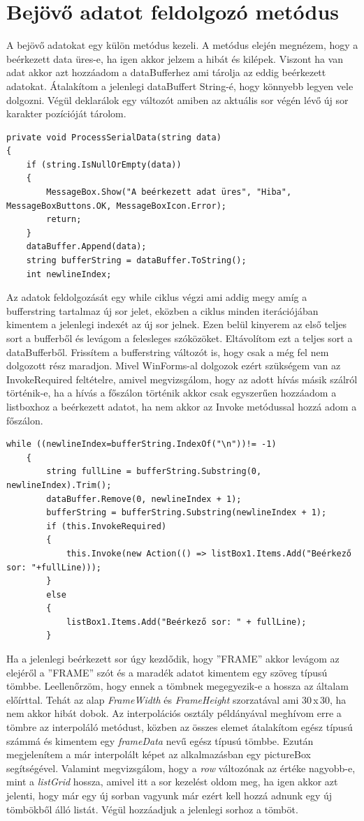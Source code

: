 \documentclass[]{thesis-ekf}
\theoremstyle{definition}
\theoremstyle{remark}
\begin{document}
\section{Bejövő adatot feldolgozó metódus}
A bejövő adatokat egy külön metódus kezeli. A metódus elején megnézem, hogy a beérkezett data üres-e, ha igen akkor jelzem a hibát és kilépek. Viszont ha van adat akkor azt hozzáadom a dataBufferhez ami tárolja az eddig beérkezett adatokat. Átalakítom a jelenlegi dataBuffert String-é, hogy könnyebb legyen vele dolgozni. Végül deklarálok egy változót amiben az aktuális sor végén lévő új sor karakter pozícióját tárolom.
\begin{lstlisting}[language=CSharp, basicstyle=\small]
private void ProcessSerialData(string data)
{
	if (string.IsNullOrEmpty(data))
	{
		MessageBox.Show("A beérkezett adat üres", "Hiba", MessageBoxButtons.OK, MessageBoxIcon.Error);
		return;
	}
	dataBuffer.Append(data); 
	string bufferString = dataBuffer.ToString();
	int newlineIndex;
\end{lstlisting}
Az adatok feldolgozását egy while ciklus végzi ami addig megy amíg a bufferstring tartalmaz új sor jelet, eközben a ciklus minden iterációjában kimentem a jelenlegi indexét az új sor jelnek. Ezen belül kinyerem az első teljes sort a bufferből és levágom a felesleges szóközöket. Eltávolítom ezt a teljes sort a dataBufferből. Frissítem a bufferstring változót is, hogy csak a még fel nem dolgozott rész maradjon. Mivel WinForms-al\cite{winforms} dolgozok ezért szükségem van az InvokeRequired feltételre, amivel megvizsgálom, hogy az adott hívás másik szálról történik-e, ha a hívás a főszálon történik akkor csak egyszerűen hozzáadom a listboxhoz\cite{listbox} a beérkezett adatot, ha nem akkor az Invoke metódussal hozzá adom a főszálon.
\begin{lstlisting}[language=CSharp]
	while ((newlineIndex=bufferString.IndexOf("\n"))!= -1)
	{
		string fullLine = bufferString.Substring(0, newlineIndex).Trim(); 
		dataBuffer.Remove(0, newlineIndex + 1);
		bufferString = bufferString.Substring(newlineIndex + 1);
		if (this.InvokeRequired)
		{
			this.Invoke(new Action(() => listBox1.Items.Add("Beérkező sor: "+fullLine)));
		}
		else
		{
			listBox1.Items.Add("Beérkező sor: " + fullLine);
		}
\end{lstlisting}
Ha a jelenlegi beérkezett sor úgy kezdődik, hogy ''FRAME'' akkor levágom az elejéről a ''FRAME'' szót és a maradék adatot kimentem egy szöveg típusú tömbbe. Leellenőrzöm, hogy ennek a tömbnek megegyezik-e a hossza az általam előírttal. Tehát az alap \emph{FrameWidth} és \emph{FrameHeight} szorzatával ami 30\,x\,30, ha nem akkor hibát dobok. Az interpolációs osztály példányával meghívom erre a tömbre az interpoláló metódust, közben az összes elemet átalakítom egész típusú számmá és kimentem egy \emph{frameData} nevű egész típusú tömbbe. Ezután megjelenítem a már interpolált képet az alkalmazásban egy pictureBox segítségével. Valamint megvizsgálom, hogy a \emph{row} változónak az értéke nagyobb-e, mint a \emph{listGrid} hossza, amivel itt a sor kezelést oldom meg, ha igen akkor azt jelenti, hogy már egy új sorban vagyunk már ezért kell hozzá adnunk egy új tömbökből álló listát. Végül hozzáadjuk a jelenlegi sorhoz a tömböt. 
\end{document}
